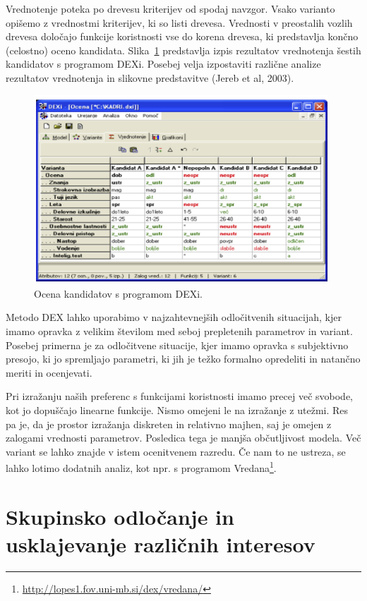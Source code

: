 Vrednotenje poteka po drevesu kriterijev od spodaj navzgor. Vsako varianto opišemo z vrednostmi kriterijev, ki so listi drevesa. Vrednosti v preostalih vozlih drevesa določajo funkcije koristnosti vse do korena drevesa, ki predstavlja končno (celostno) oceno kandidata. Slika~\ref{f-dexi} predstavlja izpis rezultatov vrednotenja  šestih kandidatov s programom DEXi. Posebej velja izpostaviti različne analize rezultatov vrednotenja in slikovne predstavitve (Jereb et al, 2003).

\begin{figure}[htbp]
\begin{center}
\includegraphics[width=11cm]{slike/dexi.png}
\caption{Ocena kandidatov s programom DEXi.}
\label{f-dexi}
\end{center}
\end{figure}

Metodo DEX lahko uporabimo v najzahtevnejših odločitvenih situacijah, kjer imamo opravka z velikim številom med seboj prepletenih parametrov in variant. Posebej primerna je za odločitvene situacije, kjer imamo opravka s subjektivno presojo, ki jo spremljajo parametri, ki jih je težko formalno opredeliti in natančno meriti in ocenjevati. 

Pri izražanju naših preferenc s funkcijami koristnosti imamo precej več svobode, kot jo dopuščajo linearne funkcije. Nismo omejeni le na izražanje z utežmi. Res pa je, da je prostor izražanja diskreten in relativno majhen, saj je omejen z zalogami vrednosti parametrov. Posledica tega je manjša občutljivost modela. Več variant se lahko znajde v istem ocenitvenem razredu. Če nam to ne ustreza, se lahko lotimo dodatnih analiz, kot npr. s programom Vredana\footnote{\url{http://lopes1.fov.uni-mb.si/dex/vredana/}}.
 

\section{Skupinsko odločanje in usklajevanje različnih interesov}

